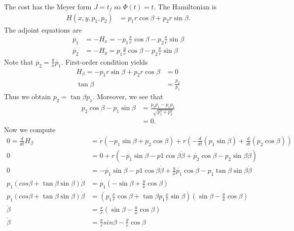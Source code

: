 \documentclass[12pt]{article}
\begin{document}
\begin{problem}[5]
The cost has the Meyer form $ J = t_f$ so  $ \Phi(t) = t$. The Hamiltonian is
\begin{align*}
	H(x,y,p_1,p_2) &= p_1 r \cos \beta + p_2 r \sin \beta .
\end{align*}
The adjoint equations are
\begin{align*}
	\dot{p_1} &= -H_x = - p_1 \frac{x}{r} \cos \beta - p_2 \frac{x}{r} \sin \beta \\
	\dot{p_2} &= -H_y = p_1 \frac{y}{r} \cos \beta - p_2 \frac{x}{r} \sin \beta 
\end{align*}
Note that $ \dot{p_2} = \frac{y}{x} \dot{p_1}$. First-order condition yields
\begin{align*}
	H_{\beta} = -p_1 r \sin \beta + p_2 r \cos \beta &= 0 \\
	\tan \beta &= \frac{p_2}{p_1} 
\end{align*}
Thus we obtain $ p_2 = \tan \beta p_1$. Moreover, we see that
\begin{align*}
	p_2 \cos \beta - p_1 \sin \beta &= \frac{p_2p_1 - p_1 p_2}{ \sqrt{p_1^2+p_2^2} } \\
	&= 0 .
\end{align*}
Now we compute
\begin{align*}
	0=\frac{d}{dt} H_{ \beta} &= \dot{r} (-p_1 \sin \beta + p_2 \cos \beta) + r\left( -\frac{d}{dt}(p_1 \sin \beta) + \frac{d}{dt}(p_2 \cos \beta) \right)  \\
				0&=0 + r \left( -\dot{p_1} \sin \beta - p1 \cos \beta \dot{\beta} + \dot{p_2} \cos \beta - p_2 \sin \beta \dot{\beta} \right)   \\
				0&= -\dot{p_1} \sin \beta - p1 \cos \beta \dot{\beta} + \frac{y}{x} \dot{p_1} \cos \beta - p_1\tan \beta \sin \beta \dot{\beta} \\
				p_1 (cos \beta + \tan \beta \sin \beta) \dot{ \beta} &= \dot{p_1} \left( - \sin \beta + \frac{y}{x} \cos \beta \right)  \\
				p_1 (cos \beta + \tan \beta \sin \beta) \dot{ \beta} &= \left( p_1 \frac{x}{r} \cos \beta + \tan \beta p_1 \frac{x}{r} \sin \beta \right)  \left( \sin \beta - \frac{y}{x} \cos \beta \right)  \\
				\dot{\beta}&= \frac{x}{r} \left( \sin \beta - \frac{y}{x} \cos \beta \right)  \\
				\dot{\beta} &=  \frac{x}{r} sin \beta - \frac{y}{r} \cos \beta
\end{align*}
\end{problem}


\end{document}
